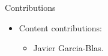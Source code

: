 \begin{frame}[t]{Contributions}
\begin{itemize}
  \item Content contributions:
    \begin{itemize}
      \item Javier Garcia-Blas.
    \end{itemize}
\end{itemize}
\end{frame}
